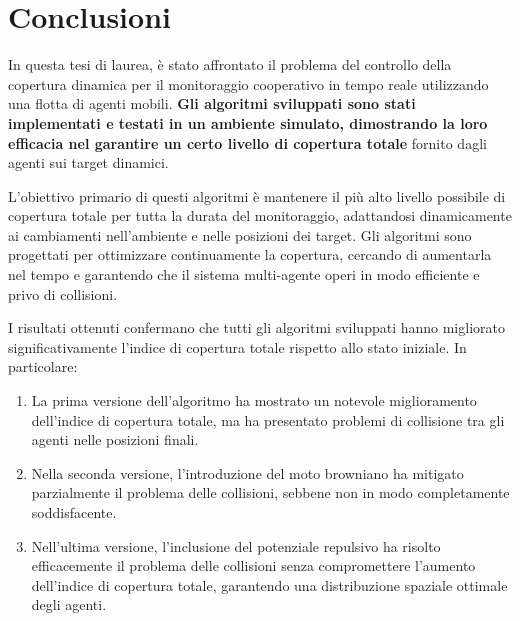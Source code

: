 \documentclass[twoside]{article}
\begin{document}
\newpage
{}
\section*{\LARGE Conclusioni}

\vspace{\baselineskip}

In questa tesi di laurea, è stato affrontato il problema del controllo della copertura dinamica per il monitoraggio cooperativo in tempo reale utilizzando una flotta di agenti mobili. \textbf{Gli algoritmi sviluppati sono stati implementati e testati in un ambiente simulato, dimostrando la loro efficacia nel garantire un certo livello di copertura totale} fornito dagli agenti sui target dinamici.

\vspace{\baselineskip}

L'obiettivo primario di questi algoritmi è mantenere il più alto livello possibile di copertura totale per tutta la durata del monitoraggio, adattandosi dinamicamente ai cambiamenti nell'ambiente e nelle posizioni dei target. Gli algoritmi sono progettati per ottimizzare continuamente la copertura, cercando di aumentarla nel tempo e garantendo che il sistema multi-agente operi in modo efficiente e privo di collisioni.

\vspace{\baselineskip}

I risultati ottenuti confermano che tutti gli algoritmi sviluppati hanno migliorato significativamente l'indice di copertura totale rispetto allo stato iniziale. In particolare:

\begin{enumerate}
    \item La prima versione dell'algoritmo ha mostrato un notevole miglioramento dell'indice di copertura totale, ma ha presentato problemi di collisione tra gli agenti nelle posizioni finali.
    \item Nella seconda versione, l'introduzione del moto browniano ha mitigato parzialmente il problema delle collisioni, sebbene non in modo completamente soddisfacente.
    \item Nell'ultima versione, l'inclusione del potenziale repulsivo ha risolto efficacemente il problema delle collisioni senza compromettere l'aumento dell'indice di copertura totale, garantendo una distribuzione spaziale ottimale degli agenti.
\end{enumerate}
\end{document}
